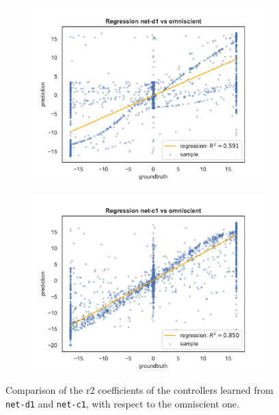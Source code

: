 \begin{figure}[!htb]
	\begin{center}
		\begin{subfigure}[h]{0.49\textwidth}
			\includegraphics[width=\textwidth]{contents/images/net-d1/regression-net-d1-vs-omniscient}%
		\end{subfigure}
		\hfill\vspace{-0.5cm}
		\begin{subfigure}[h]{0.49\textwidth}
			\includegraphics[width=\textwidth]{contents/images/net-c1/regression-net-c1-vs-omniscient}%
		\end{subfigure}
	\end{center}
	\caption[Evaluation of the \gls{r2} coefficients of \texttt{net-c1}.]{Comparison 
		of the \gls{r2} coefficients of the controllers learned from \texttt{net-d1} and 
		\texttt{net-c1}, with respect to the omniscient one.}
	\label{fig:net-c1r2}
\end{figure}


